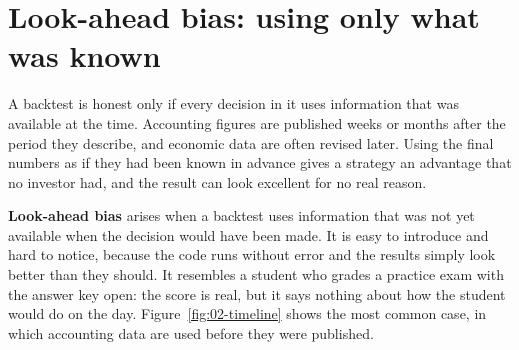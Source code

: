 \section{Look-ahead bias: using only what was known}
\label{sec:02-lookahead}

A backtest is honest only if every decision in it uses information that was available at the time. Accounting figures are published weeks or months after the period they describe, and economic data are often revised later. Using the final numbers as if they had been known in advance gives a strategy an advantage that no investor had, and the result can look excellent for no real reason.

\textbf{Look-ahead bias} arises when a backtest uses information that was not yet available when the decision would have been made. It is easy to introduce and hard to notice, because the code runs without error and the results simply look better than they should. It resembles a student who grades a practice exam with the answer key open: the score is real, but it says nothing about how the student would do on the day. Figure~\ref{fig:02-timeline} shows the most common case, in which accounting data are used before they were published.



